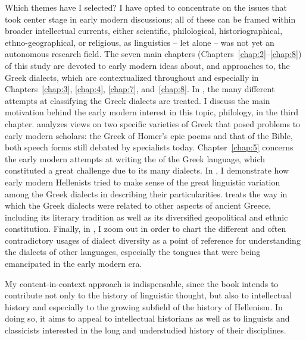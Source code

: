 Which themes have I selected? I have opted to concentrate on the issues that took center stage in early modern discussions; all of these can be framed within broader intellectual currents, either scientific, philological, historiographical, eth\-no-geographical, or religious, as linguistics – let alone  – was not yet an autonomous research field. The seven main chapters (Chapters~\ref{chap:2}–\ref{chap:8}) of this study are devoted to early modern ideas about, and approaches to, the Greek dialects, which are contextualized throughout and especially in Chapters~\ref{chap:3}, \ref{chap:4}, \ref{chap:7}, and~\ref{chap:8}. In , the many different attempts at classifying the Greek dialects are treated. I discuss the main motivation behind the early modern interest in this topic, philology, in the third chapter.  analyzes views on two specific varieties of Greek that posed problems to early modern scholars: the Greek of Homer’s epic poems and that of the Bible, both speech forms still debated by specialists today. Chapter~\ref{chap:5} concerns the early modern attempts at writing the  of the Greek language, which constituted a great challenge due to its many dialects. In , I demonstrate how early modern Hellenists tried to make sense of the great linguistic variation among the Greek dialects in describing their particularities.  treats the way in which the Greek dialects were related to other aspects of ancient Greece, including its literary tradition as well as its diversified geopolitical and ethnic constitution. Finally, in , I zoom out in order to chart the different and often contradictory usages of  dialect diversity as a point of reference for understanding the dialects of other languages, especially the  tongues that were being emancipated in the early modern era.

My content-in-context approach is indispensable, since the book intends to contribute not only to the history of linguistic thought, but also to intellectual history and especially to the growing subfield of the history of Hellenism. In doing so, it aims to appeal to intellectual historians as well as to linguists and classicists interested in the long and understudied history of their disciplines.
